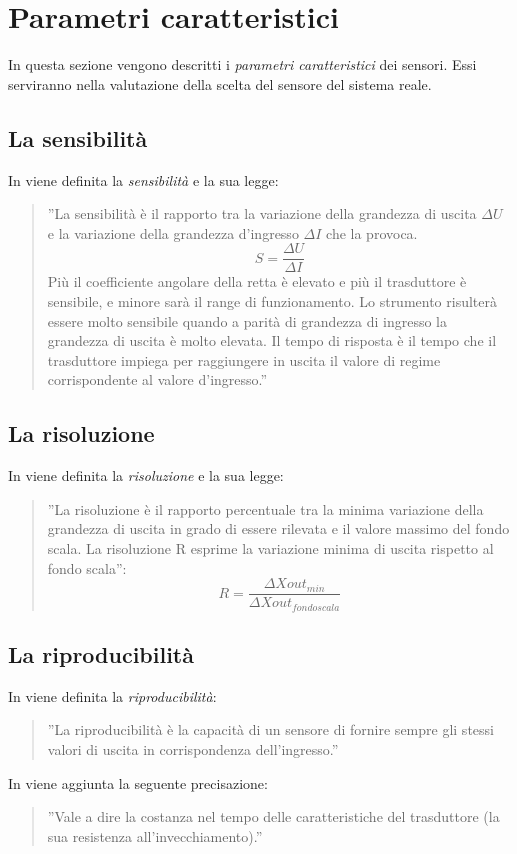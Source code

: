 \documentclass[a4paper]{report} %
\begin{document}
\section{Parametri caratteristici}
In questa sezione vengono descritti i \textit{parametri caratteristici} dei sensori. Essi serviranno nella valutazione della scelta del sensore del sistema reale.
\subsection{La sensibilità}
In \cite{art:rif.11} viene definita la \textit{sensibilità} e la sua legge:
\begin{quote}
	''La sensibilità è il rapporto tra la variazione della grandezza di uscita $\Delta U$ e la variazione della grandezza d'ingresso $\Delta I$ che la provoca. 
	\begin{equation}
	S = \frac{\Delta U}{\Delta I}
	\end{equation}
	Più il coefficiente angolare della retta è elevato e più il trasduttore è sensibile, e minore sarà il range di funzionamento. Lo strumento risulterà essere molto sensibile quando a parità di grandezza di ingresso la grandezza di uscita è molto elevata.
	Il tempo di risposta è il tempo che il trasduttore impiega per raggiungere in uscita il valore di regime corrispondente al valore d'ingresso.''
\end{quote}
 
\subsection{La risoluzione}
In \cite{art:rif.11} viene definita la \textit{risoluzione} e la sua legge:
\begin{quote}
	''La risoluzione è il rapporto percentuale tra la minima variazione della grandezza di uscita in grado di essere rilevata e il valore massimo del fondo scala.
	La risoluzione R esprime la variazione minima di uscita rispetto al fondo scala'':
	\begin{equation}
	R = \frac{\Delta Xout_{min}}{\Delta Xout_{fondo scala}}
	\end{equation}
\end{quote}
 
\subsection{La riproducibilità}
In \cite{art:rif.11} viene definita la \textit{riproducibilità}:
\begin{quote}
	''La riproducibilità è la capacità di un sensore di fornire sempre gli stessi valori di uscita in corrispondenza dell'ingresso.'' 
\end{quote}
In \cite{art:rif.17} viene aggiunta la seguente precisazione:
\begin{quote}
	''Vale a dire la costanza nel tempo delle caratteristiche del trasduttore (la sua resistenza all'invecchiamento).''
\end{quote}
 
\end{document}

